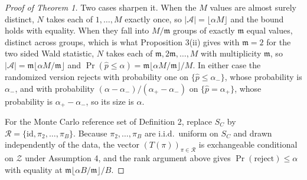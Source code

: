 \documentclass[12pt]{article}
\theoremstyle{definition}
\numberwithin{equation}{section}
\begin{document}
\begin{proof}[Proof of Theorem 1]
Two cases sharpen it. When the $M$ values are almost surely distinct, $N$ takes
each of $1,\dots,M$ exactly once, so $|\mathcal{A}| = \lfloor \alpha M \rfloor$
and the bound holds with equality. When they fall into $M/\mathfrak{m}$ groups of
exactly $\mathfrak{m}$ equal values, distinct across groups, which is what
Proposition 3(ii) gives with $\mathfrak{m} = 2$ for the
two sided Wald statistic, $N$ takes each of $\mathfrak{m}, 2\mathfrak{m},\dots,M$ with
multiplicity $\mathfrak{m}$, so $|\mathcal{A}| = \mathfrak{m}\lfloor \alpha
M/\mathfrak{m} \rfloor$ and $\Pr(\hat{p} \le \alpha) = \mathfrak{m}\lfloor \alpha
M/\mathfrak{m}\rfloor/M$. In either case the randomized version rejects with
probability one on
$\{\hat{p} \le \alpha_-\}$, whose probability is $\alpha_-$, and with
probability $(\alpha-\alpha_-)/(\alpha_+-\alpha_-)$ on $\{\hat{p} = \alpha_+\}$,
whose probability is $\alpha_+-\alpha_-$, so its size is $\alpha$.

For the Monte Carlo reference set of Definition 2, replace $S_C$ by
$\mathcal{R} = \{\mathrm{id},\pi_2,\dots,\pi_B\}$. Because $\pi_2,\dots,\pi_B$
are i.i.d.\ uniform on $S_C$ and drawn independently of the data, the vector
$(T(\pi))_{\pi \in \mathcal{R}}$ is exchangeable conditional on $\mathcal{Z}$
under Assumption 4, and the rank argument above gives
$\Pr(\text{reject}) \le \alpha$ with equality at
$\mathfrak{m}\lfloor \alpha B/\mathfrak{m}\rfloor/B$.
\end{proof}
\end{document}

